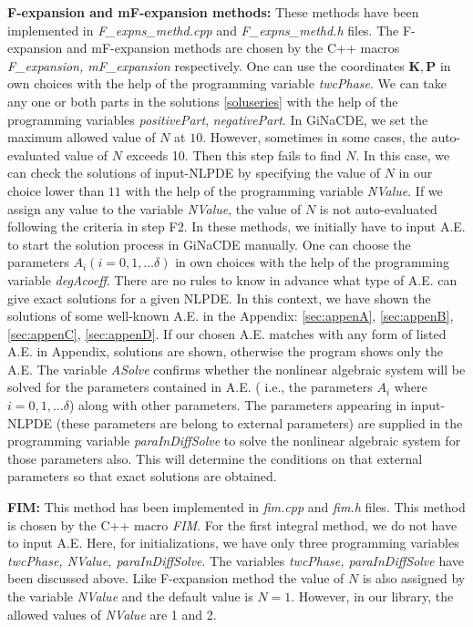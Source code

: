 \documentclass[prd,aps,floats,showkeys,nofootinbib,notitlepage]{revtex4-2}
\begin{document}
	\textbf{F-expansion and mF-expansion methods:} These methods have been implemented in \textit{F\_expns\_methd.cpp} and \textit{F\_expns\_methd.h} files.
	The F-expansion and mF-expansion methods are chosen by the C++ macros {\em F\_expansion, mF\_expansion} respectively. 
	One can use the coordinates $\boldsymbol{K},\boldsymbol{P}$ in own choices with the help of the programming variable \textit{twcPhase}.
	We can take any one or both parts in the solutions \eqref{soluseries} with the help of the programming variables \textit{positivePart}, \textit{negativePart}. In GiNaCDE, we set the maximum allowed value of $N$ at $10$. However, sometimes in some cases, the auto-evaluated value of $N$ exceeds 10. Then this step fails to find $N$.
	In this case, we can check the solutions of input-NLPDE by specifying the value of $N$ in our choice lower than $11$ with the help of the programming variable {\em NValue}. If we assign any value to the variable {\em NValue}, the value of $N$ is not auto-evaluated following the criteria in step F2.
	In these methods, we initially have to input A.E. to start the solution process in GiNaCDE manually. One can choose the parameters $A_i(i=0,1,\ldots \delta)$ in own choices with the help of the programming variable \textit{degAcoeff}. There are no rules to know in advance what type of A.E. can give exact solutions for a given NLPDE. In this context, we have shown the solutions of some well-known A.E. in the Appendix: \ref{sec:appenA}, \ref{sec:appenB}, \ref{sec:appenC}, \ref{sec:appenD}. If our chosen A.E. matches with any form of listed A.E. in Appendix, solutions are shown, otherwise the program shows only the A.E.
	The variable {\em ASolve} confirms whether the nonlinear algebraic system will be solved for the parameters contained in A.E. ( i.e., the parameters $A_i$ where $i=0,1,\ldots \delta$) along with other parameters. The parameters appearing in input-NLPDE (these parameters are belong to external parameters) are supplied in the programming variable {\em paraInDiffSolve} to solve the nonlinear algebraic system for those parameters also.
	This will determine the conditions on that external parameters so that exact solutions are obtained.
	
	\textbf{FIM:} This method has been implemented in \textit{fim.cpp} and \textit{fim.h} files. This method is chosen by the C++ macro {\em FIM}. For the first integral method, we do not have to input A.E. Here, for initializations, we have only three programming variables \textit{twcPhase, NValue, paraInDiffSolve}. The variables \textit{twcPhase, paraInDiffSolve} have been discussed above. Like F-expansion method the value of $N$ is also assigned by the variable {\em NValue} and the default value is $N=1$. However, in our library, the allowed values of {\em NValue} are 1 and 2. 
		
\end{document}
